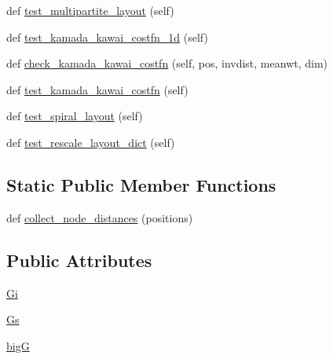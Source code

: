 \begin{DoxyCompactItemize}
def \hyperlink{classnetworkx_1_1drawing_1_1tests_1_1test__layout_1_1TestLayout_a79379e44a1e8b6e6d45821decb2e02d7}{test\+\_\+multipartite\+\_\+layout} (self)
\item 
def \hyperlink{classnetworkx_1_1drawing_1_1tests_1_1test__layout_1_1TestLayout_a2bfe8de195b1bc9fb7ddf6aaf0a6749d}{test\+\_\+kamada\+\_\+kawai\+\_\+costfn\+\_\+1d} (self)
\item 
def \hyperlink{classnetworkx_1_1drawing_1_1tests_1_1test__layout_1_1TestLayout_a83d6296adad9fecc0cbcb915da4bc310}{check\+\_\+kamada\+\_\+kawai\+\_\+costfn} (self, pos, invdist, meanwt, dim)
\item 
def \hyperlink{classnetworkx_1_1drawing_1_1tests_1_1test__layout_1_1TestLayout_a612f826b3492ed14b68f2d0ed5560ba1}{test\+\_\+kamada\+\_\+kawai\+\_\+costfn} (self)
\item 
def \hyperlink{classnetworkx_1_1drawing_1_1tests_1_1test__layout_1_1TestLayout_ad3176e29408e1e8929cf9293a53b4d06}{test\+\_\+spiral\+\_\+layout} (self)
\item 
def \hyperlink{classnetworkx_1_1drawing_1_1tests_1_1test__layout_1_1TestLayout_acc7dc76c0ab755914b8144346446f0d5}{test\+\_\+rescale\+\_\+layout\+\_\+dict} (self)
\end{DoxyCompactItemize}
\subsection*{Static Public Member Functions}
\begin{DoxyCompactItemize}
\item 
def \hyperlink{classnetworkx_1_1drawing_1_1tests_1_1test__layout_1_1TestLayout_a5600a0149891e17a51353b478ba818e0}{collect\+\_\+node\+\_\+distances} (positions)
\end{DoxyCompactItemize}
\subsection*{Public Attributes}
\begin{DoxyCompactItemize}
\item 
\hyperlink{classnetworkx_1_1drawing_1_1tests_1_1test__layout_1_1TestLayout_a6b0f575493753040c4981463e8470b63}{Gi}
\item 
\hyperlink{classnetworkx_1_1drawing_1_1tests_1_1test__layout_1_1TestLayout_a24f0bcebcbdf2bee666a8665f032c4f5}{Gs}
\item 
\hyperlink{classnetworkx_1_1drawing_1_1tests_1_1test__layout_1_1TestLayout_ad2d0fc566e1dd4758f462fecb5a65b1f}{bigG}
\end{DoxyCompactItemize}


